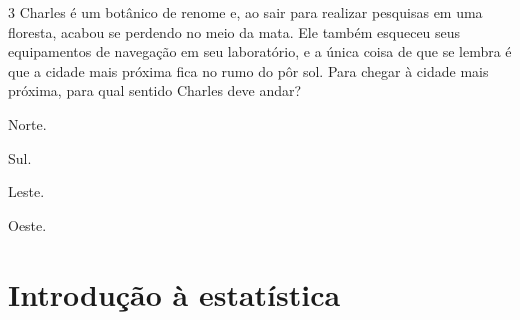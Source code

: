{{{%








\num{3} Charles é um botânico de renome e, ao sair para realizar pesquisas em
uma floresta, acabou se perdendo no meio da mata. Ele também esqueceu
seus equipamentos de navegação em seu laboratório, e a única coisa de
que se lembra é que a cidade mais próxima fica no rumo do pôr sol. Para
chegar à cidade mais próxima, para qual sentido Charles deve andar?

\begin{escolha}[itemsep=0pt]
\item Norte.
\item Sul.
\item Leste.
\item Oeste.
\end{escolha}







\chapter{Introdução à estatística}

}}}
